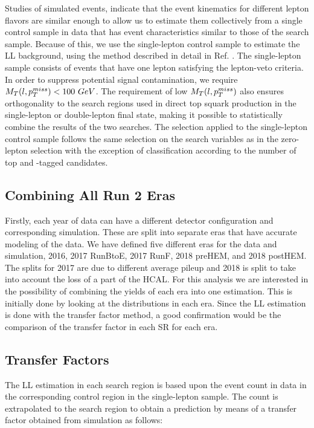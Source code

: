Studies of simulated events, indicate that the event kinematics for different lepton flavors are similar enough to allow us to estimate them collectively from a single control sample in data that has event characteristics similar to those of the search sample. Because of this, we use the single-lepton control sample to estimate the LL background, using the method described in detail in Ref. \cite{bravo_search_2015}. The single-lepton sample consists of events that have one lepton satisfying the lepton-veto criteria. In order to suppress potential signal contamination, we require $M_T(l,p_{T}^{miss})<100~GeV$. The requirement of low $M_T(l,p_{T}^{miss})$ also ensures orthogonality to the search regions used in direct top squark production in the single-lepton or double-lepton final state, making it possible to statistically combine the results of the two searches. The selection applied to the single-lepton control sample follows the same selection on the search variables as in the zero-lepton selection with the exception of classification according to the number of top and \W-tagged candidates. 

\subsection{Combining All Run 2 Eras}\label{sec:LLCombination}
Firstly, each year of data can have a different detector configuration and corresponding simulation. These are split into separate eras that have accurate modeling of the data. We have defined five different eras for the data and simulation, 2016, 2017 RunBtoE, 2017 RunF, 2018 preHEM, and 2018 postHEM. The splits for 2017 are due to different average pileup and 2018 is split to take into account the loss of a part of the HCAL. For this analysis we are interested in the possibility of combining the yields of each era into one estimation. This is initially done by looking at the \met{} distributions in each era. Since the LL estimation is done with the transfer factor method, a good confirmation would be the comparison of the transfer factor in each SR for each era. 


\subsection{Transfer Factors}
\label{subsec:TF}

The LL estimation in each search region is based upon the event count in data in the corresponding control region in the single-lepton sample. The count is extrapolated to the search region to obtain a prediction by means of a transfer factor obtained from simulation as follows: 

